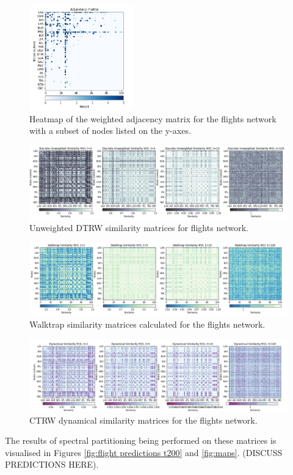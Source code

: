 \documentclass[12pt,a4paper]{article}
\begin{document}
\begin{figure}[H]
  \centering
  \includegraphics[width=0.4\textwidth]{flight_net/flights adjacency.png}
  \caption{Heatmap of the weighted adjacency matrix for the flights network \cite{flightdata} with a subset of nodes listed on the y-axes.}
  \label{fig:flights adjacency matrix}
\end{figure}
\begin{figure}[H]
    \centering
    \includegraphics[width=\textwidth]{flight_net/DTRWu_Similarity_flights.png}
    \caption{Unweighted DTRW similarity matrices for flights network.}
    \label{fig:DTRW flights}
\end{figure}
\begin{figure}[H]
    \centering
    \includegraphics[width=\textwidth]{flight_net/Walktrap_Similarity_flights.png}
    \caption{Walktrap similarity matrices calculated for the flights network.}
    \label{fig:Walktrap flights}
\end{figure}
\begin{figure}[H]
    \centering
    \includegraphics[width=\textwidth]{flight_net/Dynamical_Similarity_flights.png}
    \caption{CTRW dynamical similarity matrices for the flights network.}
    \label{fig:dynamical similarity matrix flights}
\end{figure}
The results of spectral partitioning being performed on these matrices is visualised in Figures \ref{fig:flight predictions t200} and \ref{fig:maps}. (DISCUSS PREDICTIONS HERE).
\end{document}
